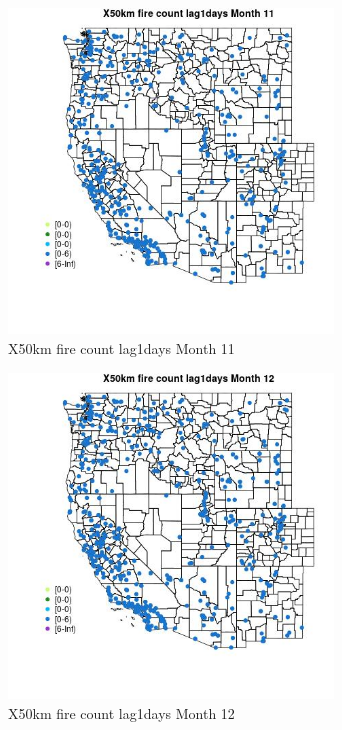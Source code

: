 \begin{figure} 
\centering  
\includegraphics[width=0.77\textwidth]{Code_Outputs/Report_ML_input_PM25_Step4_part_e_de_duplicated_aves_compiled_2019-05-14wNAs_MapObsMo11X50km_fire_count_lag1days.jpg} 
\caption{\label{fig:Report_ML_input_PM25_Step4_part_e_de_duplicated_aves_compiled_2019-05-14wNAsMapObsMo11X50km_fire_count_lag1days}X50km fire count lag1days Month 11} 
\end{figure} 
 

\begin{figure} 
\centering  
\includegraphics[width=0.77\textwidth]{Code_Outputs/Report_ML_input_PM25_Step4_part_e_de_duplicated_aves_compiled_2019-05-14wNAs_MapObsMo12X50km_fire_count_lag1days.jpg} 
\caption{\label{fig:Report_ML_input_PM25_Step4_part_e_de_duplicated_aves_compiled_2019-05-14wNAsMapObsMo12X50km_fire_count_lag1days}X50km fire count lag1days Month 12} 
\end{figure} 
 


